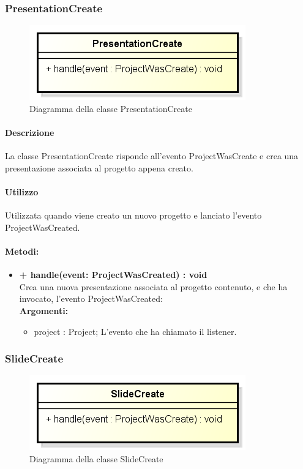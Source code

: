 \subsubsection{PresentationCreate}
\begin{figure}[h]
	\centering
	\includegraphics[width=0.5\linewidth]{img/premi_back_end_presentation_create}
	\caption[Diagramma della classe PresentationCreate]{Diagramma della classe PresentationCreate}
	\label{fig:premi_back_end_presentation_create}
\end{figure}


\paragraph{Descrizione}
La classe PresentationCreate risponde all'evento ProjectWasCreate e crea una presentazione associata al progetto appena creato.

\paragraph{Utilizzo}
Utilizzata quando viene creato un nuovo progetto e lanciato l'evento ProjectWasCreated.

\paragraph{Metodi:}
\begin{itemize}
	\item \textbf{+ handle(event: ProjectWasCreated) : void}\\
	Crea una nuova presentazione associata al progetto contenuto, e che ha invocato, l'evento ProjectWasCreated:\\
	\textbf{Argomenti:}
	\begin{itemize}
		\item project : Project;
		L'evento che ha chiamato il listener.
	\end{itemize}
\end{itemize}

\subsubsection{SlideCreate}
\begin{figure}[h]
	\centering
	\includegraphics[width=0.5\linewidth]{img/premi_back_end_slide_create}
	\caption[Diagramma della classe SlideCreate]{Diagramma della classe SlideCreate}
	\label{fig:premi_back_end_slide_create}
\end{figure}


